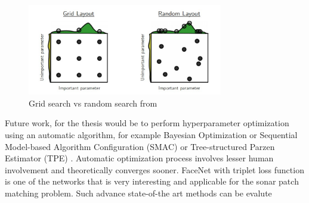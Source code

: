\begin{figure}[ht]
\centering
\includegraphics[height= 4cm]{images/densenet/random_search_over_grid_search}
\caption{Grid search vs random search from \cite{bergstra2012random}}
\label{fig:random_search_over_grid_search}
\end{figure}

Future work, for the thesis would be to perform hyperparameter optimization using an automatic algorithm, for example Bayesian Optimization \cite{snoek2012practical} or Sequential Model-based Algorithm Configuration (SMAC) \cite{hutter2011sequential} or 
Tree-structured Parzen Estimator (TPE) \cite{bergstra2011algorithms}. Automatic optimization process involves lesser human involvement and theoretically converges sooner.
FaceNet \cite{schroff2015facenet} with triplet loss function is one of the networks that is very interesting and applicable for the sonar patch matching problem. Such advance state-of-the art methods can be evalute
